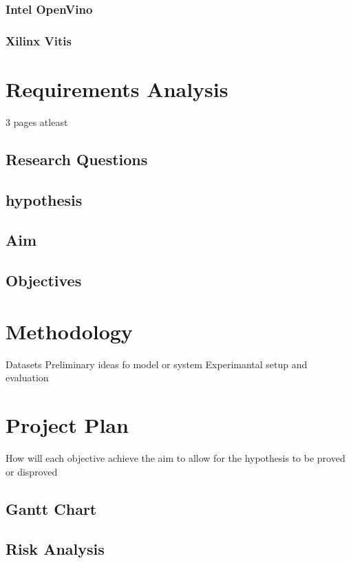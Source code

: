 \documentclass[12pt]{article}
\begin{document}
\subsubsection{Intel OpenVino}
\subsubsection{Xilinx Vitis}

\section{Requirements Analysis}
3 pages atleast

\subsection{Research Questions}
\subsection{hypothesis}
\subsection{Aim}
\subsection{Objectives}

\section{Methodology}
Datasets
Preliminary ideas fo model or system
Experimantal setup and evaluation

\section{Project Plan}
How will each objective achieve the aim to allow for the hypothesis to be proved or disproved

\subsection{Gantt Chart}

\subsection{Risk Analysis}

\newpage


\end{document}
